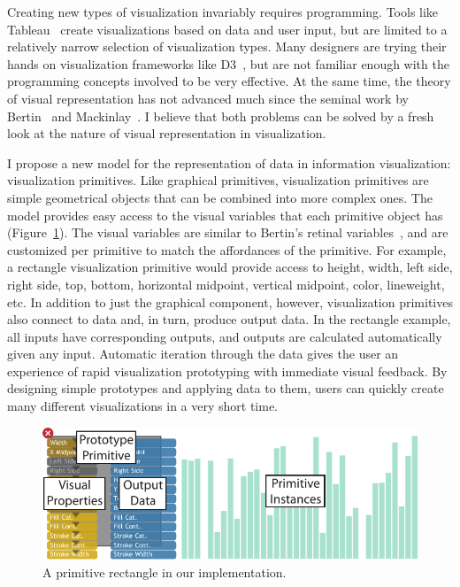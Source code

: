 \label{Intro}

Creating new types of visualization invariably requires programming.
Tools like Tableau~\cite{stolte2002polaris} create visualizations based on data and user input, but are limited to a relatively narrow selection of visualization types.
Many designers are trying their hands on visualization frameworks like D3~\cite{bostock2011d3}, but are not familiar enough with the programming concepts involved to be very effective.
At the same time, the theory of visual representation has not advanced much since the seminal work by Bertin~\cite{bertin1983semiology} and Mackinlay~\cite{Mackinlay1986}.
I believe that both problems can be solved by a fresh look at the nature of visual representation in visualization.

I propose a new model for the representation of data in information visualization: visualization primitives.
Like graphical primitives, visualization primitives are simple geometrical objects that can be combined into more complex ones.
The model provides easy access to the visual variables that each primitive object has (Figure~\ref{fig:primitive}).
The visual variables are similar to Bertin's retinal variables~\cite{bertin1983semiology}, and are customized per primitive to match the affordances of the primitive.
For example, a rectangle visualization primitive would provide access to height, width, left side, right side, top, bottom, horizontal midpoint, vertical midpoint, color, lineweight, etc.
In addition to just the graphical component, however, visualization primitives also connect to data and, in turn, produce output data.
In the rectangle example, all inputs have corresponding outputs, and outputs are calculated automatically given any input.
Automatic iteration through the data gives the user an experience of rapid visualization prototyping with immediate visual feedback.
By designing simple prototypes and applying data to them, users can quickly create many different visualizations in a very short time.

\begin{figure}[t]
\centering
\includegraphics[width=\textwidth]{images/primitive.pdf}
\caption{A primitive rectangle in our implementation.}
\label{fig:primitive}
\end{figure}


